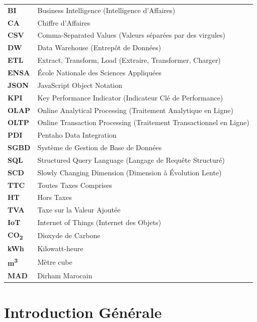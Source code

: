 \documentclass[12pt,a4paper]{report}
\begin{document}
\begin{tabular}{ll}
\textbf{BI} & Business Intelligence (Intelligence d'Affaires) \\
\textbf{CA} & Chiffre d'Affaires \\
\textbf{CSV} & Comma-Separated Values (Valeurs séparées par des virgules) \\
\textbf{DW} & Data Warehouse (Entrepôt de Données) \\
\textbf{ETL} & Extract, Transform, Load (Extraire, Transformer, Charger) \\
\textbf{ENSA} & École Nationale des Sciences Appliquées \\
\textbf{JSON} & JavaScript Object Notation \\
\textbf{KPI} & Key Performance Indicator (Indicateur Clé de Performance) \\
\textbf{OLAP} & Online Analytical Processing (Traitement Analytique en Ligne) \\
\textbf{OLTP} & Online Transaction Processing (Traitement Transactionnel en Ligne) \\
\textbf{PDI} & Pentaho Data Integration \\
\textbf{SGBD} & Système de Gestion de Base de Données \\
\textbf{SQL} & Structured Query Language (Langage de Requête Structuré) \\
\textbf{SCD} & Slowly Changing Dimension (Dimension à Évolution Lente) \\
\textbf{TTC} & Toutes Taxes Comprises \\
\textbf{HT} & Hors Taxes \\
\textbf{TVA} & Taxe sur la Valeur Ajoutée \\
\textbf{IoT} & Internet of Things (Internet des Objets) \\
\textbf{CO\textsubscript{2}} & Dioxyde de Carbone \\
\textbf{kWh} & Kilowatt-heure \\
\textbf{m\textsuperscript{3}} & Mètre cube \\
\textbf{MAD} & Dirham Marocain \\
\end{tabular}

\cleardoublepage


\chapter*{Introduction Générale}
\end{document}
